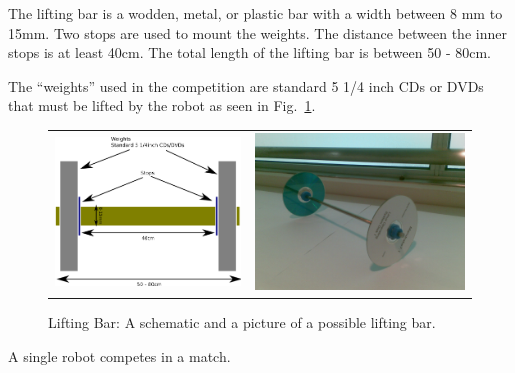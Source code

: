 \documentclass[12pt]{hurocup}
\begin{document}
\begin{lawlist}[WL]

\item The lifting bar is a wodden, metal, or plastic bar with a width
  between 8 mm to 15mm. Two stops are used to mount the weights. The
  distance between the inner stops is at least 40cm. The total length
  of the lifting bar is between 50 - 80cm.

\item The ``weights'' used in the competition are standard 5 1/4 inch
 CDs or DVDs that must be lifted by the robot as seen in
 Fig.~\ref{fig:lifting-bar}.

\begin{figure}
\begin{center}
\begin{tabular}{cc}
\includegraphics[width=0.4\linewidth]{Figures/lifting-bar-diagram} 
&
\includegraphics[width=0.4\linewidth]{Figures/lifting-bar1} 
\end{tabular}
\caption{Lifting Bar: A schematic and a picture of a possible lifting
bar.}
\label{fig:lifting-bar}
\end{center}
\end{figure}

\end{lawlist}


\begin{lawlist}[WL]
\item A single robot competes in a match.
\end{lawlist}

\end{document}
